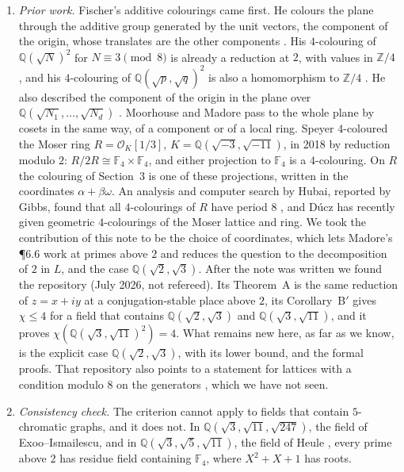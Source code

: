 \documentclass[11pt,a4paper]{amsart}
\theoremstyle{remark}
\newcommand{\F}{\mathbb{F}}
\newcommand{\Q}{\mathbb{Q}}
\newcommand{\Z}{\mathbb{Z}}
\begin{document}
\begin{enumerate}
\item \emph{Prior work.} Fischer's additive colourings \cite{Fischer1990,Fischer1994} came first. He colours the
plane through the additive group generated by the unit vectors, the component of the origin, whose translates
are the other components \cite[Thm.~1]{Fischer1990}. His $4$-colouring of $\Q(\sqrt N)^2$ for \mbox{$N\equiv3\pmod 8$}
is already a reduction at $2$, with values in $\Z/4$ \cite[Thm.~10]{Fischer1990}, and his $4$-colouring of
$\Q(\sqrt p,\sqrt q)^2$ is also a homomorphism to $\Z/4$ \cite{Fischer1994}. He also described the component of
the origin in the plane over $\Q(\sqrt{N_1},\dots,\sqrt{N_d})$ \cite{Fischer1990b}. Moorhouse
\cite[Lemma~4.2]{Moorhouse} and Madore \mbox{\cite[Prop.~3.2]{Madore}} pass to the whole plane by cosets in the same
way, of a component or of a local ring. Speyer \cite{Polymath2} $4$-coloured the Moser ring
$R=\mathcal{O}_K[1/3]$, $K=\Q(\sqrt{-3},\sqrt{-11})$, in 2018 by reduction modulo $2$:
$R/2R\cong\F_4\times\F_4$, and either projection to $\F_4$ is a $4$-colouring. On $R$ the colouring of
Section~3 is one of these projections, written in the coordinates $\alpha+\beta\omega$. An analysis and computer
search by Hubai, reported by Gibbs, found that all $4$-colourings of $R$ have period $8$ \cite{Polymath3}, and
D\'ucz \cite{Ducz} has recently given geometric $4$-colourings of the Moser lattice and ring. We took the
contribution of this note to be the choice of coordinates, which lets Madore's \P6.6 work at primes above $2$ and
reduces the question to the decomposition of $2$ in $L$, and the case $\Q(\sqrt2,\sqrt3)$. After the note was
written we found the repository \cite{MM} (July 2026, not refereed). Its Theorem~A is the same reduction of
$z=x+iy$ at a conjugation-stable place above $2$, its Corollary~B$'$ gives $\chi\le4$ for a field that contains
$\Q(\sqrt2,\sqrt3)$ and $\Q(\sqrt3,\sqrt{11})$, and it proves $\chi(\Q(\sqrt3,\sqrt{11})^2)=4$. What remains new
here, as far as we know, is the explicit case $\Q(\sqrt2,\sqrt3)$, with its lower bound, and the formal proofs.
That repository also points to a statement for lattices with a condition modulo $8$ on the generators
\cite[Thm.~2.3]{ACLMSS}, which we have not seen.
\item \emph{Consistency check.} The criterion cannot apply to fields that contain $5$-chromatic graphs, and it
does not. In $\Q(\sqrt3,\sqrt{11},\sqrt{247})$, the field of Exoo--Ismailescu, and in
$\Q(\sqrt3,\sqrt5,\sqrt{11})$, the field of Heule \cite{Heule}, every prime above $2$ has residue field
containing $\F_4$, where $X^2+X+1$ has roots.
\end{enumerate}
\end{document}
